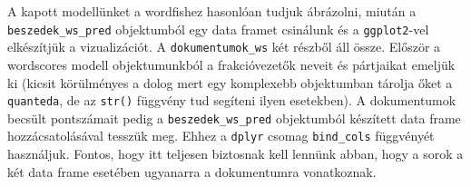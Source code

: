 \documentclass[
]{book}
\newenvironment{Shaded}{\begin{snugshade}}{\end{snugshade}}
\newcommand{\AttributeTok}[1]{\textcolor[rgb]{0.77,0.63,0.00}{#1}}
\newcommand{\CommentTok}[1]{\textcolor[rgb]{0.56,0.35,0.01}{\textit{#1}}}
\newcommand{\FunctionTok}[1]{\textcolor[rgb]{0.00,0.00,0.00}{#1}}
\newcommand{\NormalTok}[1]{#1}
\newcommand{\OtherTok}[1]{\textcolor[rgb]{0.56,0.35,0.01}{#1}}
\newcommand{\SpecialCharTok}[1]{\textcolor[rgb]{0.00,0.00,0.00}{#1}}
\newcommand{\StringTok}[1]{\textcolor[rgb]{0.31,0.60,0.02}{#1}}
\begin{document}
\begin{Shaded}
\end{Shaded}

A kapott modellünket a wordfishez hasonlóan tudjuk ábrázolni, miután a
\texttt{beszedek\_ws\_pred} objektumból egy data framet csinálunk és a
\texttt{ggplot2}-vel elkészítjük a vizualizációt. A
\texttt{dokumentumok\_ws} két részből áll össze. Először a wordscores
modell objektumunkból a frakcióvezetők neveit és pártjaikat emeljük ki
(kicsit körülményes a dolog mert egy komplexebb objektumban tárolja őket
a \texttt{quanteda}, de az \texttt{str()} függvény tud segíteni ilyen
esetekben). A dokumentumok becsült pontszámait pedig a
\texttt{beszedek\_ws\_pred} objektumból készített data frame
hozzácsatolásával tesszük meg. Ehhez a \texttt{dplyr} csomag
\texttt{bind\_cols} függvényét használjuk. Fontos, hogy itt teljesen
biztosnak kell lennünk abban, hogy a sorok a két data frame esetében
ugyanarra a dokumentumra vonatkoznak.
\end{document}
